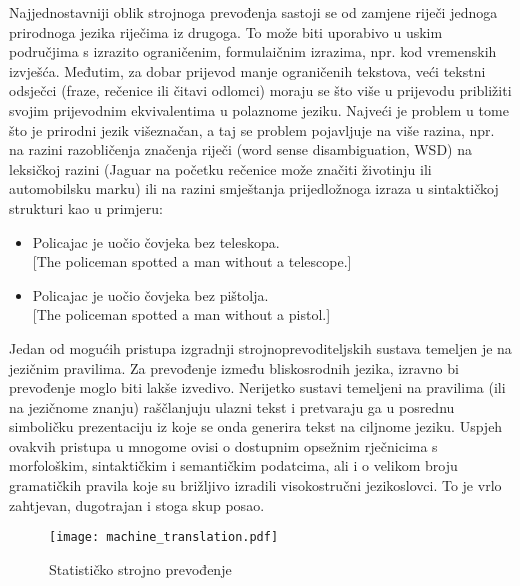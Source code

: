 \begin{multicols}{2}

Najjednostavniji oblik strojnoga prevođenja sastoji se od zamjene riječi jednoga prirodnoga jezika riječima iz drugoga. To može biti uporabivo u uskim područjima s izrazito ograničenim, formulaičnim izrazima, npr. kod vremenskih izvješća. Međutim, za dobar prijevod manje ograničenih tekstova, veći tekstni odsječci (fraze, rečenice ili čitavi odlomci) moraju se što više u prijevodu približiti svojim prijevodnim ekvivalentima u polaznome jeziku. Najveći je problem u tome što je prirodni jezik višeznačan, a taj se problem pojavljuje na više razina, npr. na razini razobličenja značenja riječi (word sense disambiguation, WSD) na leksičkoj razini (Jaguar na početku rečenice može značiti životinju ili automobilsku marku) ili na razini smještanja prijedložnoga izraza u sintaktičkoj strukturi kao u primjeru:

\begin{itemize}
\item Policajac je uočio čovjeka bez teleskopa.\\
  {[}The policeman spotted a man without a telescope.{]} 
\item Policajac je uočio čovjeka bez pištolja.\\
  {[}The policeman spotted a man without a pistol.{]}
\end{itemize}

Jedan od mogućih pristupa izgradnji strojnoprevoditeljskih sustava temeljen je na jezičnim pravilima. Za prevođenje između bliskosrodnih jezika, izravno bi prevođenje moglo biti lakše izvedivo. Nerijetko sustavi temeljeni na pravilima (ili na jezičnome znanju) raščlanjuju ulazni tekst i pretvaraju ga u posrednu simboličku prezentaciju iz koje se onda generira tekst na ciljnome jeziku. Uspjeh ovakvih pristupa u mnogome ovisi o dostupnim opsežnim rječnicima s morfološkim, sintaktičkim i semantičkim podatcima, ali i o velikom broju gramatičkih pravila koje su brižljivo izradili visokostručni jezikoslovci. To je vrlo zahtjevan, dugotrajan i stoga skup posao.

\begin{figure*}[htb]
  \center
  \texttt{[image: machine\_translation.pdf]}
  \caption{Statističko strojno prevođenje}
  \label{fig:mtarch_cro}
\end{figure*}


\end{multicols}
